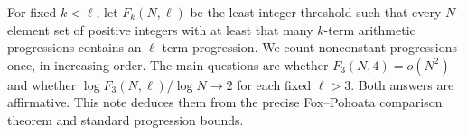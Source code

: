 For fixed $k<\ell$, let $F_k(N,\ell)$ be the least integer threshold
such that every $N$-element set of positive integers with at least that
many $k$-term arithmetic progressions contains an $\ell$-term progression.
We count nonconstant progressions once, in increasing order. The main
questions are whether $F_3(N,4)=o(N^2)$ and whether
$\log F_3(N,\ell)/\log N\to2$ for each fixed $\ell>3$.
Both answers are affirmative. This note deduces them from the precise
Fox--Pohoata comparison theorem and standard progression bounds.
